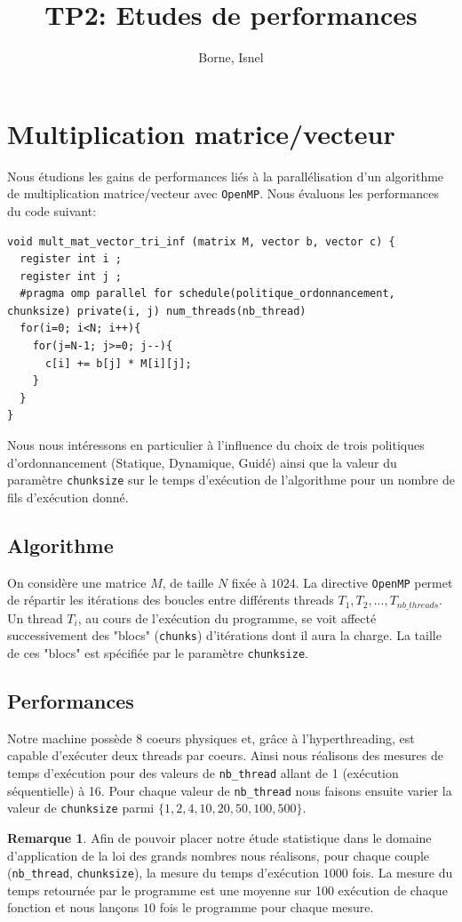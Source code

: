 \documentclass[11pt]{article}
\author{Borne, Isnel}
\date{}
\title{TP2: Etudes de performances}
\theoremstyle{definition}
\theoremstyle{definition}
\newtheorem*{myrem}{Remarque}
\theoremstyle{definition}
\begin{document}
\maketitle

\section{Multiplication matrice/vecteur}
Nous étudions les gains de performances
liés à la parallélisation d'un algorithme de multiplication matrice/vecteur avec \texttt{OpenMP}.
Nous évaluons les performances du code suivant:
\begin{verbatim}
void mult_mat_vector_tri_inf (matrix M, vector b, vector c) {
  register int i ;
  register int j ;
  #pragma omp parallel for schedule(politique_ordonnancement, chunksize) private(i, j) num_threads(nb_thread)
  for(i=0; i<N; i++){
    for(j=N-1; j>=0; j--){
      c[i] += b[j] * M[i][j];
    }
  }
}\end{verbatim}
Nous nous intéressons en particulier à l'influence du choix de trois politiques d'ordonnancement (Statique, Dynamique, Guidé) ainsi que la valeur du paramètre \texttt{chunksize} sur le temps d'exécution de l'algorithme pour un nombre de fils d'exécution donné.
\subsection{Algorithme}
On considère une matrice $M$, de taille $N$ fixée à $1024$.
La directive \texttt{OpenMP} permet de répartir les itérations des boucles entre différents threads $T_1, T_2, ..., T_{nb\_threads}$. Un thread $T_i$, au cours de l'exécution du programme, se voit affecté successivement des "blocs" (\texttt{chunks}) d'itérations dont il aura la charge. La taille de ces "blocs" est spécifiée par le paramètre \texttt{chunksize}.

\subsection{Performances}
Notre machine possède 8 coeurs physiques et, grâce à l'hyperthreading, est capable d'exécuter deux threads par coeurs. Ainsi nous réalisons des mesures de temps d'exécution pour des valeurs de \texttt{nb\_thread} allant de 1 (exécution séquentielle) à 16. Pour chaque valeur de \texttt{nb\_thread} nous faisons ensuite varier la valeur de \texttt{chunksize} parmi $\{1, 2, 4, 10, 20, 50, 100, 500\}$.
\begin{myrem}
  Afin de pouvoir placer notre étude statistique dans le domaine d'application de la loi des grands nombres nous réalisons, pour chaque couple (\texttt{nb\_thread}, \texttt{chunksize}), la mesure du temps d'exécution $1000$ fois. La mesure du temps retournée par le programme est une moyenne sur 100 exécution de chaque fonction et nous lançons $10$ fois le programme pour chaque mesure. 
\end{myrem}
\end{document}
